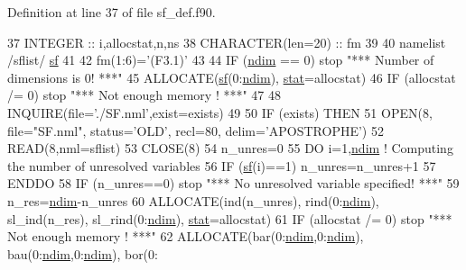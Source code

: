 Definition at line 37 of file sf\+\_\+def.\+f90.


\begin{DoxyCode}
37     \textcolor{keywordtype}{INTEGER} :: i,allocstat,n,ns
38     \textcolor{keywordtype}{CHARACTER(len=20)} :: fm
39 
40     namelist /sflist/ \hyperlink{namespacesf__def_ad000452ff3b9c4c5ce070c04d0521b52}{sf}
41 
42     fm(1:6)=\textcolor{stringliteral}{'(F3.1)'}
43    
44     \textcolor{keywordflow}{IF} (\hyperlink{namespaceparams_a2323fe1773f086e20c14f266351c482b}{ndim} == 0) stop \textcolor{stringliteral}{"*** Number of dimensions is 0! ***"}
45     \textcolor{keyword}{ALLOCATE}(\hyperlink{namespacesf__def_ad000452ff3b9c4c5ce070c04d0521b52}{sf}(0:\hyperlink{namespaceparams_a2323fe1773f086e20c14f266351c482b}{ndim}), \hyperlink{namespacestat}{stat}=allocstat)
46     \textcolor{keywordflow}{IF} (allocstat /= 0) stop \textcolor{stringliteral}{"*** Not enough memory ! ***"}
47 
48     \textcolor{keyword}{INQUIRE}(file=\textcolor{stringliteral}{'./SF.nml'},exist=exists)
49 
50     \textcolor{keywordflow}{IF} (exists) \textcolor{keywordflow}{THEN}
51        \textcolor{keyword}{OPEN}(8, file=\textcolor{stringliteral}{"SF.nml"}, status=\textcolor{stringliteral}{'OLD'}, recl=80, delim=\textcolor{stringliteral}{'APOSTROPHE'})
52        \textcolor{keyword}{READ}(8,nml=sflist)
53        \textcolor{keyword}{CLOSE}(8)
54        n\_unres=0
55        \textcolor{keywordflow}{DO} i=1,\hyperlink{namespaceparams_a2323fe1773f086e20c14f266351c482b}{ndim} \textcolor{comment}{! Computing the number of unresolved variables}
56           \textcolor{keywordflow}{IF} (\hyperlink{namespacesf__def_ad000452ff3b9c4c5ce070c04d0521b52}{sf}(i)==1) n\_unres=n\_unres+1
57 \textcolor{keywordflow}{       ENDDO}
58        \textcolor{keywordflow}{IF} (n\_unres==0) stop \textcolor{stringliteral}{"*** No unresolved variable specified! ***"}
59        n\_res=\hyperlink{namespaceparams_a2323fe1773f086e20c14f266351c482b}{ndim}-n\_unres
60        \textcolor{keyword}{ALLOCATE}(ind(n\_unres), rind(0:\hyperlink{namespaceparams_a2323fe1773f086e20c14f266351c482b}{ndim}), sl\_ind(n\_res), sl\_rind(0:\hyperlink{namespaceparams_a2323fe1773f086e20c14f266351c482b}{ndim}), 
      \hyperlink{namespacestat}{stat}=allocstat)
61        \textcolor{keywordflow}{IF} (allocstat /= 0) stop \textcolor{stringliteral}{"*** Not enough memory ! ***"}
62        \textcolor{keyword}{ALLOCATE}(bar(0:\hyperlink{namespaceparams_a2323fe1773f086e20c14f266351c482b}{ndim},0:\hyperlink{namespaceparams_a2323fe1773f086e20c14f266351c482b}{ndim}), bau(0:\hyperlink{namespaceparams_a2323fe1773f086e20c14f266351c482b}{ndim},0:\hyperlink{namespaceparams_a2323fe1773f086e20c14f266351c482b}{ndim}), bor(0:

\end{DoxyCode}
